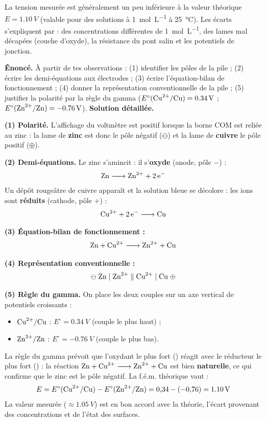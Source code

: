 \documentclass[11pt]{article}
\newcommand{\cle}[1]{{\popxbold\color{popdark}#1}}
\newcounter{popsec}
\newcounter{popsub}
\newcommand{\courssub}[1]{%
  \stepcounter{popsub}%
  \par\vspace{9pt}\noindent{\popxbold\fontsize{11.5}{13}\selectfont\color{popink}{\color{poporange}\thepopsec.\thepopsub}\hspace{6pt}#1}\par\nopagebreak\vspace{4pt}
}
\begin{document}
La tension mesurée est généralement un peu inférieure à la valeur théorique $E = \SI{1,10}{V}$ (valable pour des solutions à \SI{1}{mol.L^{-1}} à \SI{25}{\celsius}). Les écarts s'expliquent par : des concentrations différentes de \SI{1}{mol.L^{-1}}, des lames mal décapées (couche d'oxyde), la résistance du pont salin et les potentiels de jonction.

\courssub{Exploitation}

\begin{exoresolu}
\textbf{Énoncé.} À partir de tes observations : (1) identifier les pôles de la pile ; (2) écrire les demi-équations aux électrodes ; (3) écrire l'équation-bilan de fonctionnement ; (4) donner la représentation conventionnelle de la pile ; (5) justifier la polarité par la règle du gamma ($E^\circ(\ce{Cu^2+}/\ce{Cu}) = \SI{+0,34}{V}$ ; $E^\circ(\ce{Zn^2+}/\ce{Zn}) = \SI{-0,76}{V}$).
\tcblower
\textbf{Solution détaillée.}

\textbf{(1) Polarité.} L'affichage du voltmètre est positif lorsque la borne COM est reliée au zinc : la lame de \textbf{zinc} est donc le \cle{pôle négatif} ($\ominus$) et la lame de \textbf{cuivre} le \cle{pôle positif} ($\oplus$).

\textbf{(2) Demi-équations.} Le zinc s'amincit : il s'\textbf{oxyde} (anode, pôle $-$) :
\[ \ce{Zn -> Zn^2+ + 2e-} \]
Un dépôt rougeâtre de cuivre apparaît et la solution bleue se décolore : les ions  sont \textbf{réduits} (cathode, pôle $+$) :
\[ \ce{Cu^2+ + 2e- -> Cu} \]

\textbf{(3) Équation-bilan de fonctionnement :}
\[ \ce{Zn + Cu^2+ -> Zn^2+ + Cu} \]

\textbf{(4) Représentation conventionnelle :}
\[ \ominus \; \ce{Zn} \mid \ce{Zn^2+} \parallel \ce{Cu^2+} \mid \ce{Cu} \; \oplus \]

\textbf{(5) Règle du gamma.} On place les deux couples sur un axe vertical de potentiels croissants :
\begin{itemize}
  \item $\ce{Cu^2+}/\ce{Cu}$ : $E^\circ = \SI{+0,34}{V}$ (couple le plus haut) ;
  \item $\ce{Zn^2+}/\ce{Zn}$ : $E^\circ = \SI{-0,76}{V}$ (couple le plus bas).
\end{itemize}
La règle du gamma prévoit que l'oxydant le plus fort () réagit avec le réducteur le plus fort () : la réaction $\ce{Zn + Cu^2+ -> Zn^2+ + Cu}$ est bien \textbf{naturelle}, ce qui confirme que le zinc est le pôle négatif. La f.é.m. théorique vaut :
\[ E = E^\circ(\ce{Cu^2+}/\ce{Cu}) - E^\circ(\ce{Zn^2+}/\ce{Zn}) = 0{,}34 - (-0{,}76) = \SI{1,10}{V} \]
La valeur mesurée ($\approx \SI{1,05}{V}$) est en bon accord avec la théorie, l'écart provenant des concentrations et de l'état des surfaces.
\end{exoresolu}
\end{document}
